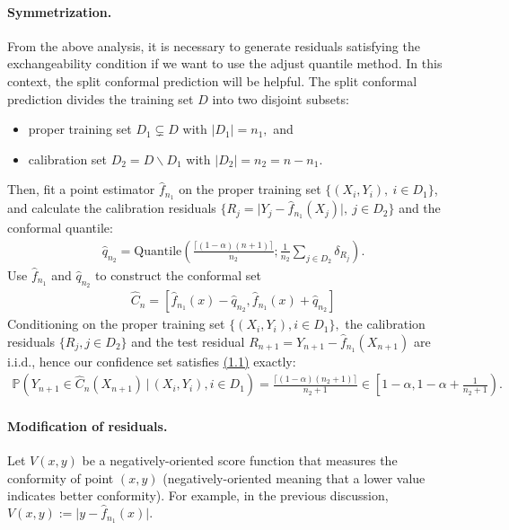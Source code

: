 \documentclass{article}
\numberwithin{equation}{section}
\begin{document}
\paragraph{Symmetrization.} From the above analysis, it is necessary to generate residuals satisfying the exchangeability condition if we want to use the adjust quantile method. In this context, the split conformal prediction will be helpful. The split conformal prediction divides the training set $D$ into two disjoint subsets:
\begin{itemize}
	\item proper training set $D_1\subsetneq D$ with $\vert D_1\vert = n_1,$ and
	\item calibration set $D_2=D\backslash D_1$ with $\vert D_2\vert = n_2 = n-n_1.$
\end{itemize}
Then, fit a point estimator $\widehat{f}_{n_1}$ on the proper training set $\{(X_i,Y_i),\ i\in D_1\}$, and calculate the calibration residuals $\{R_j = \vert Y_j - \widehat{f}_{n_1}(X_j)\vert,\ j\in D_2\}$ and the conformal quantile:
\begin{align*}
	\widehat{q}_{n_2} = \mathrm{Quantile}\left(\frac{\lceil(1-\alpha)(n+1)\rceil}{n_2};\frac{1}{n_2}\sum_{j\in D_2}\delta_{R_j}\right).\tag{2.3}
\end{align*}
Use $\widehat{f}_{n_1}$ and $\widehat{q}_{n_2}$ to construct the conformal set
\begin{align*}
	\widehat{C}_n = \left[\widehat{f}_{n_1}(x)-\widehat{q}_{n_2},\widehat{f}_{n_1}(x)+\widehat{q}_{n_2}\right]\tag{2.4}
\end{align*}
Conditioning on the proper training set $\{(X_i,Y_i),i\in D_1\},$ the calibration residuals $\{R_j,j\in D_2\}$ and the test residual $R_{n+1}=Y_{n+1} - \widehat{f}_{n_1}(X_{n+1})$ are i.i.d., hence our confidence set satisfies \hyperref[1.1]{(1.1)} exactly:
\begin{align*}
	\mathbb{P}\left(Y_{n+1}\in\widehat{C}_n(X_{n+1})\,\big|\,(X_i,Y_i),i\in D_1\right) = \frac{\lceil(1-\alpha)(n_2+1)\rceil}{n_2+1} \in \left[1-\alpha,1-\alpha + \frac{1}{n_2+1}\right).\tag{2.5}\label{2.5}
\end{align*}

\paragraph{Modification of residuals.} Let $V(x,y)$ be a negatively-oriented score function that measures the conformity of point $(x,y)$ (negatively-oriented meaning that a lower value indicates better conformity). For example, in the previous discussion, $V(x,y):=\vert y - \widehat{f}_{n_1}(x)\vert.$
\end{document}
